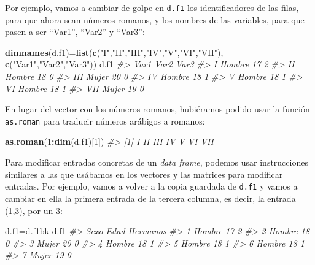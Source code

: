 \documentclass[
]{book}
\newenvironment{Shaded}{\begin{snugshade}}{\end{snugshade}}
\newcommand{\CommentTok}[1]{\textcolor[rgb]{0.56,0.35,0.01}{\textit{#1}}}
\newcommand{\DecValTok}[1]{\textcolor[rgb]{0.00,0.00,0.81}{#1}}
\newcommand{\KeywordTok}[1]{\textcolor[rgb]{0.13,0.29,0.53}{\textbf{#1}}}
\newcommand{\NormalTok}[1]{#1}
\newcommand{\OperatorTok}[1]{\textcolor[rgb]{0.81,0.36,0.00}{\textbf{#1}}}
\newcommand{\StringTok}[1]{\textcolor[rgb]{0.31,0.60,0.02}{#1}}
\theoremstyle{definition}
\theoremstyle{definition}
\theoremstyle{definition}
\theoremstyle{remark}
\begin{document}
Por ejemplo, vamos a cambiar de golpe en \texttt{d.f1} los identificadores de las filas, para que ahora sean números romanos, y los nombres de las variables, para que pasen a ser ``Var1'', ``Var2'' y ``Var3'':

\begin{Shaded}
\begin{Highlighting}[]
\KeywordTok{dimnames}\NormalTok{(d.f1)=}\KeywordTok{list}\NormalTok{(}\KeywordTok{c}\NormalTok{(}\StringTok{"I"}\NormalTok{,}\StringTok{"II"}\NormalTok{,}\StringTok{"III"}\NormalTok{,}\StringTok{"IV"}\NormalTok{,}\StringTok{"V"}\NormalTok{,}\StringTok{"VI"}\NormalTok{,}\StringTok{"VII"}\NormalTok{), }\KeywordTok{c}\NormalTok{(}\StringTok{"Var1"}\NormalTok{,}\StringTok{"Var2"}\NormalTok{,}\StringTok{"Var3"}\NormalTok{))}
\NormalTok{d.f1}
\CommentTok{\#\textgreater{}       Var1 Var2 Var3}
\CommentTok{\#\textgreater{} I   Hombre   17    2}
\CommentTok{\#\textgreater{} II  Hombre   18    0}
\CommentTok{\#\textgreater{} III  Mujer   20    0}
\CommentTok{\#\textgreater{} IV  Hombre   18    1}
\CommentTok{\#\textgreater{} V   Hombre   18    1}
\CommentTok{\#\textgreater{} VI  Hombre   18    1}
\CommentTok{\#\textgreater{} VII  Mujer   19    0}
\end{Highlighting}
\end{Shaded}

En lugar del vector con los números romanos, hubiéramos podido usar la función \texttt{as.roman} para traducir números arábigos a romanos:

\begin{Shaded}
\begin{Highlighting}[]
\KeywordTok{as.roman}\NormalTok{(}\DecValTok{1}\OperatorTok{:}\KeywordTok{dim}\NormalTok{(d.f1)[}\DecValTok{1}\NormalTok{])}
\CommentTok{\#\textgreater{} [1] I   II  III IV  V   VI  VII}
\end{Highlighting}
\end{Shaded}

Para modificar entradas concretas de un \emph{data frame}, podemos usar instrucciones similares a las que usábamos en los vectores y las matrices para modificar entradas. Por ejemplo, vamos a volver a la copia guardada de \texttt{d.f1} y vamos a cambiar en ella la primera entrada de la tercera columna, es decir, la entrada (1,3), por un 3:

\begin{Shaded}
\begin{Highlighting}[]
\NormalTok{d.f1=d.f1bk }
\NormalTok{d.f1}
\CommentTok{\#\textgreater{}     Sexo Edad Hermanos}
\CommentTok{\#\textgreater{} 1 Hombre   17        2}
\CommentTok{\#\textgreater{} 2 Hombre   18        0}
\CommentTok{\#\textgreater{} 3  Mujer   20        0}
\CommentTok{\#\textgreater{} 4 Hombre   18        1}
\CommentTok{\#\textgreater{} 5 Hombre   18        1}
\CommentTok{\#\textgreater{} 6 Hombre   18        1}
\CommentTok{\#\textgreater{} 7  Mujer   19        0}
\end{Highlighting}
\end{Shaded}
\end{document}
